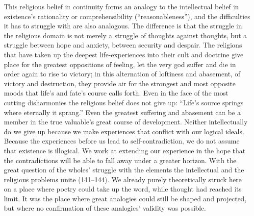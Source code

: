 \documentclass[12pt,a4paper]{book}
\begin{document}
This religious belief in continuity forms an analogy to the intellectual belief in existence's
rationality or comprehensibility (``reasonableness''), and the difficulties it has to struggle with are
also analogous. The difference is that the struggle in the religious domain is not merely a struggle of
thoughts against thoughts, but a struggle between hope and anxiety, between security and despair. The
religions that have taken up the deepest life-experiences into their cult and doctrine give place for the
greatest oppositions of feeling, let the very god suffer and die in order again to rise to victory; in
this alternation of loftiness and abasement, of victory and destruction, they provide air for the
strongest and most opposite moods that life's and fate's course calls forth. Even in the face of the
most cutting disharmonies the religious belief does not give up: ``Life's source springs where eternally
it sprang.'' Even the greatest suffering and abasement can be a member in the true valuable's great
course of development. Neither intellectually do we give up because we make experiences that conflict with our logical ideals. Because the experiences before us lead to self-contradiction, we do not
assume that existence is illogical. We work at extending our experience in the hope that the
contradictions will be able to fall away under a greater horizon. With the great question of the wholes'
struggle with the elements the intellectual and the religious problems unite (141--144). We already
purely theoretically struck here on a place where poetry could take up the word, while thought had
reached its limit. It was the place where great analogies could still be shaped and projected, but where
no confirmation of these analogies' validity was possible.
\end{document}
